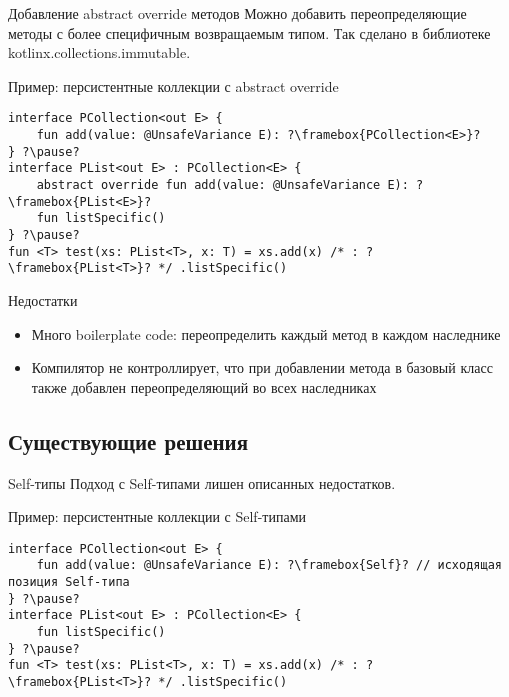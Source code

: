 \documentclass[aspectratio=169,usenames,dvipsnames]{beamer}
\begin{document}
    \begin{frame}[fragile]{Добавление abstract override методов}
        Можно добавить переопределяющие методы с более специфичным возвращаемым типом.
        Так сделано в библиотеке kotlinx.collections.immutable.
        \pause
        \begin{block}{Пример: персистентные коллекции с abstract override}
            \begin{verbatim}
interface PCollection<out E> {
    fun add(value: @UnsafeVariance E): ?\framebox{PCollection<E>}?
} ?\pause?
interface PList<out E> : PCollection<E> {
    abstract override fun add(value: @UnsafeVariance E): ?\framebox{PList<E>}?
    fun listSpecific()
} ?\pause?
fun <T> test(xs: PList<T>, x: T) = xs.add(x) /* : ?\framebox{PList<T>}? */ .listSpecific()
            \end{verbatim}
        \end{block}
        \pause
        \begin{block}{Недостатки}
            \begin{itemize}
                \item Много boilerplate code: переопределить каждый метод в каждом наследнике
                \item Компилятор не контроллирует, что при добавлении метода в базовый класс также добавлен переопределяющий во всех наследниках
            \end{itemize}
        \end{block}
    \end{frame}

    \subsection{Существующие решения}

    \begin{frame}[fragile]{Self-типы}
        Подход с Self-типами лишен описанных недостатков.
        \begin{block}{Пример: персистентные коллекции с Self-типами}
            \begin{verbatim}
interface PCollection<out E> {
    fun add(value: @UnsafeVariance E): ?\framebox{Self}? // исходящая позиция Self-типа
} ?\pause?
interface PList<out E> : PCollection<E> {
    fun listSpecific()
} ?\pause?
fun <T> test(xs: PList<T>, x: T) = xs.add(x) /* : ?\framebox{PList<T>}? */ .listSpecific()
            \end{verbatim}
        \end{block}
    \end{frame}
\end{document}
